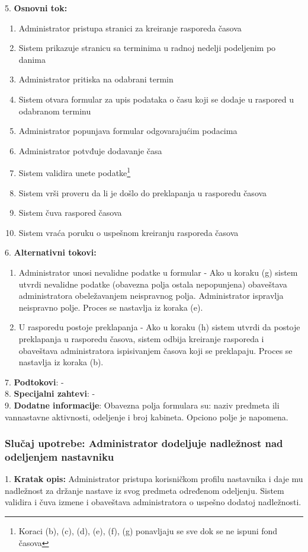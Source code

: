 \documentclass{article}
\begin{document}
5. \textbf{Osnovni tok:} 
\begin{enumerate} [label=(\alph*)]
\item Administrator pristupa stranici za kreiranje rasporeda časova
\item Sistem prikazuje stranicu sa terminima u radnoj nedelji podeljenim po danima
\item Administrator pritiska na odabrani termin
\item Sistem otvara formular za upis podataka o času koji se dodaje u raspored u odabranom terminu
\item Administrator popunjava formular odgovarajućim podacima
\item Administrator potvđuje dodavanje časa 
\item Sistem validira unete podatke\footnote{Koraci (b), (c), (d), (e), (f), (g) ponavljaju se sve dok se ne ispuni fond časova}
\item Sistem vrši proveru da li je došlo do preklapanja u rasporedu časova
\item Sistem čuva raspored časova
\item Sistem vraća poruku o uspešnom kreiranju rasporeda časova
\end{enumerate}

6. \textbf{Alternativni tokovi:}
\begin{enumerate} [label=(\roman*)]
\item Administrator unosi nevalidne podatke u formular - Ako u koraku (g) sistem utvrdi nevalidne podatke (obavezna polja ostala nepopunjena) obaveštava administratora obeležavanjem neispravnog polja. Administrator ispravlja neispravno polje. Proces se nastavlja iz koraka (e).
\item U rasporedu postoje preklapanja - Ako u koraku (h) sistem utvrdi da postoje preklapanja u rasporedu časova, sistem odbija kreiranje rasporeda i obaveštava administratora ispisivanjem časova koji se preklapaju. Proces se nastavlja iz koraka (b).
\end{enumerate}

7. \textbf{Podtokovi}: - \\

8. \textbf{Specijalni zahtevi}: - \\

9. \textbf{Dodatne informacije}: Obavezna polja formulara su: naziv predmeta ili vannastavne aktivnosti, odeljenje i broj kabineta. Opciono polje je napomena. \\

\subsubsection{Slučaj upotrebe: Administrator dodeljuje nadležnost nad odeljenjem nastavniku}
1. \textbf{Kratak opis:} Administrator pristupa korisničkom profilu nastavnika i daje mu nadležnost za držanje nastave iz svog predmeta određenom odeljenju. Sistem validira i čuva izmene i obaveštava administratora o uspešno dodatoj nadležnosti. \\
\end{document}
